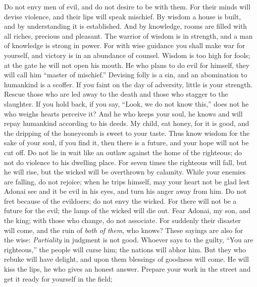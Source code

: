 \begin{biblechapter} %
\verse Do not envy men of evil, 
and do not desire to be with them.
\verse For their minds will devise violence, 
and their lips will speak mischief.
\verse By wisdom a house is built, 
and by understanding it is established.
\verse And by knowledge, rooms are filled 
with all riches, precious and pleasant.
\verse The warrior of wisdom is in strength, 
and a man of knowledge is strong in power.
\verse For with wise guidance you shall make war for yourself, 
and victory is in an abundance of counsel.
\verse Wisdom is too high for fools; 
at the gate he will not open his mouth.
\verse He who plans to do evil for himself, 
they will call him “master of mischief.”
\verse Devising folly is a sin, 
and an abomination to humankind is a scoffer.
\verse If you faint on the day of adversity, 
little is your strength.
\verse Rescue those who are led away to the death 
and those who stagger to the slaughter. If you hold back,
\verse if you say, “Look, we do not know this,” 
does not he who weighs hearts perceive it? 
And he who keeps your soul, 
he knows and will repay humankind according to his deeds.
\verse My child, eat honey, for it is good, 
and the dripping of the honeycomb is sweet to your taste.
\verse Thus know wisdom for the sake of your soul, 
if you find it, then there is a future, 
and your hope will not be cut off.
\verse Do not lie in wait like an outlaw against the home of the righteous; 
do not do violence to his dwelling place.
\verse For seven times the righteous will fall, but he will rise, 
but the wicked will be overthrown by calamity.
\verse While your enemies are falling, do not rejoice; 
when he trips himself, may your heart not be glad
\verse lest Adonai see and it be evil in his eyes, 
and turn his anger away from him.
\verse Do not fret because of the evildoers; 
do not envy the wicked.
\verse For there will not be a future for the evil; 
the lamp of the wicked will die out.
\verse Fear Adonai, my son, and the king; 
with those who change, do not associate.
\verse For suddenly their disaster will come, 
and the ruin of \textit{both of them}, who knows?
\verse These sayings are also for the wise: 
\textit{Partiality} in judgment is not good.
\verse Whoever says to the guilty, “You are righteous,” the people will curse him; 
the nations will abhor him.
\verse But they who rebuke will have delight, 
and upon them blessings of goodness will come.
\verse He will kiss the lips, 
he who gives an honest answer.
\verse Prepare your work in the street and get it ready for yourself in the field; 

\end{biblechapter}
